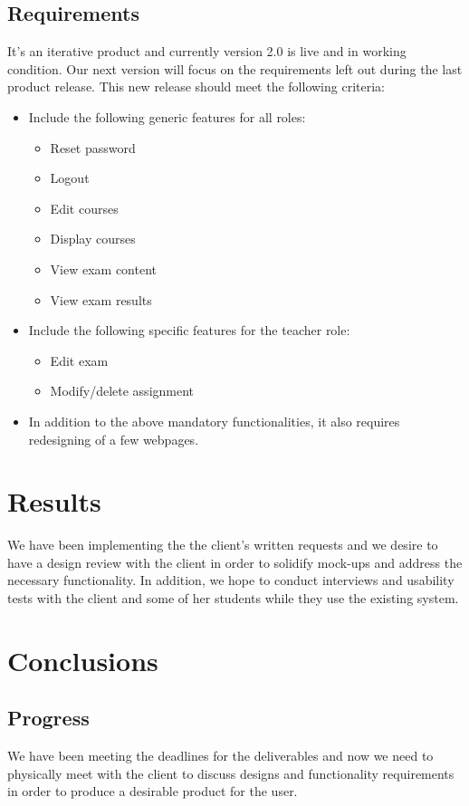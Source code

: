 \documentclass[sigchi]{acmart}
\begin{document}
		\subsection{Requirements}
			It's an iterative product and currently version 2.0 is live and in working condition. Our next version will focus on the requirements left out during the last product release. This new release should meet the following criteria:
			\begin{itemize}
				\item Include the following generic features for all roles:
				\begin{itemize}
					\item Reset password
					\item Logout
					\item Edit courses
					\item Display courses
					\item View exam content
					\item View exam results
				\end{itemize}
				\item Include the following specific features for the teacher role:
				\begin{itemize}
					\item Edit exam
					\item Modify/delete assignment
				\end{itemize}
				\item In addition to the above mandatory functionalities, it also requires redesigning of a few webpages.
				\end{itemize}
	\section{Results}
		We have been implementing the the client's written requests and we desire to have a design review with the client in order to solidify mock-ups and address the necessary functionality. In addition, we hope to conduct interviews and usability tests with the client and some of her students while they use the existing system.
	\section{Conclusions}
		\subsection{Progress}
			We have been meeting the deadlines for the deliverables and now we need to physically meet with the client to discuss designs and functionality requirements in order to produce a desirable product for the user.
\end{document}
